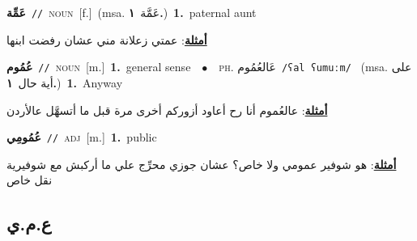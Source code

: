 \documentclass[10pt,a4paper,twoside]{article} %
\begin{document}
\begin{multicols}{2}
{\setlength\topsep{0pt}\textbf{\foreignlanguage{arabic}{عَمِّة}}\ {\color{gray}\texttt{//}\color{black}}\ \textsc{noun}\ [f.]\ \color{gray}(msa. \foreignlanguage{arabic}{عَمَّة}~\foreignlanguage{arabic}{\textbf{١.}})\color{black}\ \textbf{1.}~paternal aunt\  \begin{flushright}\color{gray}\foreignlanguage{arabic}{\textbf{\underline{\foreignlanguage{arabic}{أمثلة}}}: عمتي زعلانة مني عشان رفضت ابنها}\end{flushright}\color{black}} \vspace{2mm}

{\setlength\topsep{0pt}\textbf{\foreignlanguage{arabic}{عُمُوم}}\ {\color{gray}\texttt{//}\color{black}}\ \textsc{noun}\ [m.]\ \textbf{1.}~general sense\ \ $\bullet$\ \ \textsc{ph.} \color{gray} \foreignlanguage{arabic}{عَالعُمُوم}\color{black}\ {\color{gray}\texttt{/{\sffamily ʕal ʕumuːm}/}\color{black}}\ \color{gray} (msa. \foreignlanguage{arabic}{على أية حال}~\foreignlanguage{arabic}{\textbf{١.}})\color{black}\ \textbf{1.}~Anyway\  \begin{flushright}\color{gray}\foreignlanguage{arabic}{\textbf{\underline{\foreignlanguage{arabic}{أمثلة}}}: عالعُموم أنا رح أعاود أزوركم أخرى مرة قبل ما أتسهَّل عالأردن}\end{flushright}\color{black}} \vspace{2mm}

{\setlength\topsep{0pt}\textbf{\foreignlanguage{arabic}{عُمُومِي}}\ {\color{gray}\texttt{//}\color{black}}\ \textsc{adj}\ [m.]\ \textbf{1.}~public\  \begin{flushright}\color{gray}\foreignlanguage{arabic}{\textbf{\underline{\foreignlanguage{arabic}{أمثلة}}}: هو شوفير عمومي ولا خاص؟ عشان جوزي محرِّج علي ما أركبش مع شوفيرية نقل خاص}\end{flushright}\color{black}} \vspace{2mm}

\vspace{-3mm}
\subsection*{\color{blue}\foreignlanguage{arabic}{ع.م.ي}\color{blue}{}} 


\end{multicols}
\end{document}
